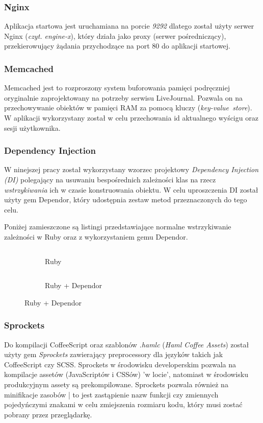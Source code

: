 \documentclass[11pt,a4paper, twoside]{article}
\begin{document}
\subsubsection{Nginx}
Aplikacja startowa jest uruchamiana na porcie \emph{9292} dlatego został użyty serwer Nginx (\emph{czyt. engine-x}), który działa jako proxy (serwer pośredniczący), przekierowujący żądania przychodzące na port 80 do aplikacji startowej.
\subsubsection{Memcached}
Memcached jest to rozproszony system buforowania pamięci podręczniej oryginalnie zaprojektowany na potrzeby serwisu  LiveJournal. Pozwala on na przechowywanie obiektów w pamięci RAM za pomocą kluczy \mbox{(\emph{key-value store})}. W aplikacji wykorzystany został w celu przechowania id aktualnego wyścigu oraz sesji użytkownika.
\subsubsection{Dependency Injection}
W ninejszej pracy został wykorzystany wzorzec projektowy \emph{Dependency Injection (DI)} polegający na usuwaniu bespośrednich zależności klas na rzecz \emph{wstrzykiwania} ich w czasie konstruowania obiektu. W celu uproszczenia  DI został użyty gem Dependor, który udostępnia zestaw metod przeznaczonych do tego celu.

Poniżej zamieszczone są listingi przedstawiające normalne wstrzykiwanie zależności w Ruby oraz z wykorzystaniem gemu Dependor.
\newline


\begin{figure}[H]
\centering
\begin{subfigure}[t]{0.45\textwidth}
\caption{Ruby}
\begin{listing}[H]
\inputminted[linenos=true]{ruby}{./src/di_ruby.rb}
\end{listing}
\end{subfigure}
\begin{subfigure}[t]{0.45\textwidth}
\caption{Ruby + Dependor}
\begin{listing}[H]
\inputminted{ruby}{./src/di_dependor.rb}
\end{listing}
\end{subfigure}
\end{figure}
\subsubsection{Sprockets}
Do kompilacji CoffeeScript oraz szablonów \emph{.hamlc} (\emph{Haml Coffee Assets}) został użyty gem \emph{Sprockets} zawierający preprocessory dla języków takich jak CoffeeScript czy SCSS. Sprockets w środowisku developerskim pozwala na kompilacje assetów (JavaScriptów i CSSów) 'w locie', natomiast w środowisku produkcyjnym assety są prekompilowane. Sprockets pozwala również na minifikacje zasobów | to jest zastąpienie nazw funkcji czy zmiennych pojedyńczymi znakami w celu zmiejszenia rozmiaru kodu, który musi zostać pobrany przez przeglądarkę. 
\end{document}
